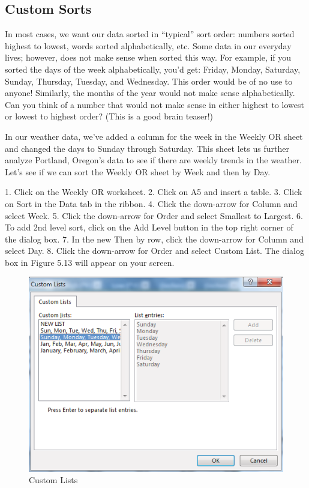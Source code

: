 \subsection{Custom Sorts}

In most cases, we want our data sorted in “typical” sort order: numbers sorted highest to lowest, words
sorted alphabetically, etc. Some data in our everyday lives; however, does not make sense when sorted
this way. For example, if you sorted the days of the week alphabetically, you’d get: Friday, Monday,
Saturday, Sunday, Thursday, Tuesday, and Wednesday. This order would be of no use to anyone!
Similarly, the months of the year would not make sense alphabetically. Can you think of a number
that would not make sense in either highest to lowest or lowest to highest order? (This is a good brain
teaser!)

In our weather data, we’ve added a column for the week in the Weekly OR sheet and changed the days
to Sunday through Saturday. This sheet lets us further analyze Portland, Oregon’s data to see if there
are weekly trends in the weather. Let’s see if we can sort the Weekly OR sheet by Week and then by
Day.

1.   Click on the Weekly OR worksheet.
2.   Click on A5 and insert a table.
3.   Click on Sort in the Data tab in the ribbon.
4.   Click the down-arrow for Column and select Week.
5.   Click the down-arrow for Order and select Smallest to Largest.
6.   To add 2nd level sort, click on the Add Level button in the top right corner of the dialog box.
7.   In the new Then by row, click the down-arrow for Column and select Day.
8.   Click the down-arrow for Order and select Custom List. The dialog box in Figure 5.13 will
appear on your screen.

\begin{figure}[H]
	\centering
	\includegraphics[width=\maxwidth{.95\linewidth}]{gfx/ch05_fig13}
	\caption{Custom Lists}
	\label{05:fig13}
\end{figure}







